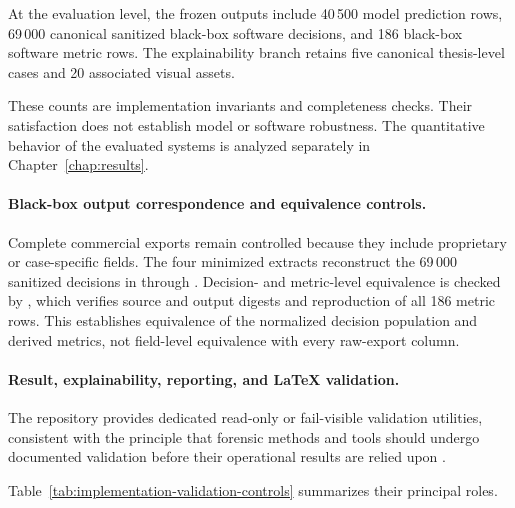 At the evaluation level, the frozen outputs include 40\,500 model
prediction rows, 69\,000 canonical sanitized black-box software decisions, and
186 black-box software metric rows. The explainability branch retains five
canonical thesis-level cases and 20 associated visual assets.

These counts are implementation invariants and completeness checks. Their
satisfaction does not establish model or software robustness. The quantitative
behavior of the evaluated systems is analyzed separately in
Chapter~\ref{chap:results}.

\paragraph{Black-box output correspondence and equivalence controls.}

Complete commercial exports remain controlled because they include proprietary
or case-specific fields. The four minimized extracts reconstruct the 69\,000
sanitized decisions in
 through
.
Decision- and metric-level equivalence is checked by
, which
verifies source and output digests and reproduction of all 186 metric rows.
This establishes equivalence of the normalized decision population and derived
metrics, not field-level equivalence with every raw-export column.

\paragraph{Result, explainability, reporting, and LaTeX validation.}

The repository provides dedicated read-only or fail-visible validation
utilities, consistent with the principle that forensic methods and tools should
undergo documented validation before their operational results are relied upon
\cite{swgde2014validation}.

Table~\ref{tab:implementation-validation-controls} summarizes their principal
roles.

